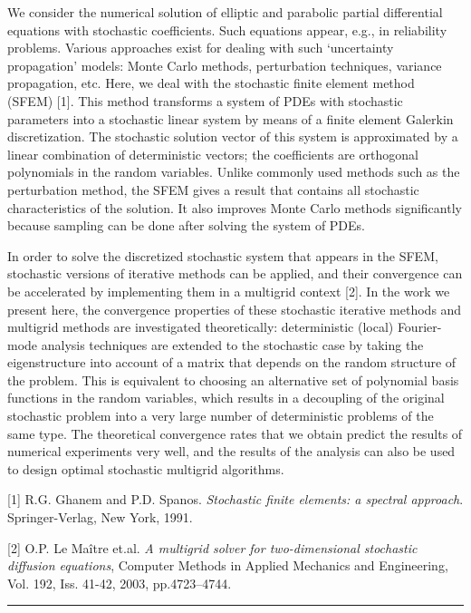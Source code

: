 \documentclass[twosided]{report}
\begin{document}
We consider the numerical solution of elliptic and parabolic partial
differential equations with stochastic coefficients. Such equations
appear, e.g., in reliability problems. Various approaches exist for
dealing with such `uncertainty propagation' models: Monte Carlo
methods, perturbation techniques, variance propagation, etc. Here, we
deal with the stochastic finite element method (SFEM) [1]. This method
transforms a system of PDEs with stochastic parameters into a
stochastic linear system by means of a finite element Galerkin
discretization. The stochastic solution vector of this system is
approximated by a linear combination of deterministic vectors; the
coefficients are orthogonal polynomials in the random variables. Unlike
commonly used methods such as the perturbation method, the SFEM gives a
result that contains all stochastic characteristics of the solution. It
also improves Monte Carlo methods significantly because sampling can be
done after solving the system of PDEs.

In order to solve the discretized stochastic system that appears in the
SFEM, stochastic versions of iterative methods can be applied, and
their convergence can be accelerated by implementing them in a
multigrid context [2]. In the work we present here, the convergence
properties of these stochastic iterative methods and multigrid methods
are investigated theoretically: deterministic (local) Fourier-mode
analysis techniques are extended to the stochastic case by taking the
eigenstructure into account of a matrix that depends on the random
structure of the problem. This is equivalent to choosing an alternative
set of polynomial basis functions in the random variables, which
results in a decoupling of the original stochastic problem into a very
large number of deterministic problems of the same type. The
theoretical convergence rates that we obtain predict the results of
numerical experiments very well, and the results of the analysis can
also be used to design optimal stochastic multigrid algorithms.

[1] R.G. Ghanem and P.D. Spanos.
{\em Stochastic finite elements: a
spectral approach}. Springer-Verlag, New York, 1991.

[2] O.P. Le Ma\^{i}tre et.al.
{\em A multigrid solver for
two-dimensional stochastic diffusion equations}, Computer Methods in
Applied Mechanics and Engineering, Vol. 192, Iss. 41-42, 2003,
pp.4723--4744.

\begin{center}

\rule{6in}{1pt}
\end{center}
\end{document}
